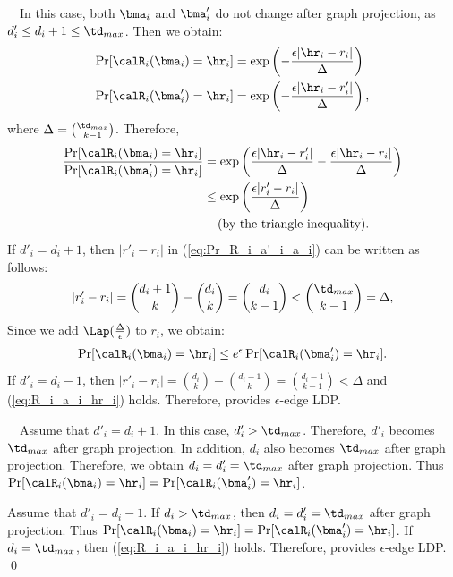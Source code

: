 \smallskip
{}~~In this case, both $\bma_i$ and $\bma'_i$ do not change after graph projection, as $d'_i \leq d_i + 1 \leq \td_{max}$. 
Then we obtain:
\begin{align*}
\Pr[\calR_i(\bma_i) = \hr_i] &= \exp\left(-\frac{\epsilon |\hr_i- r_i|}{\Delta}\right) \\
\Pr[\calR_i(\bma'_i) = \hr_i] &= \exp\left(-\frac{\epsilon |\hr_i- r'_i|}{\Delta}\right),
\end{align*}
where $\Delta = \binom{\td_{max}}{k-1}$. 
Therefore, 
\begin{align}
\frac{\Pr[\calR_i(\bma_i) = \hr_i]}{\Pr[\calR_i(\bma'_i) = \hr_i]} 
&= \exp\left( \frac{\epsilon |\hr_i- r'_i|}{\Delta} - \frac{\epsilon |\hr_i- r_i|}{\Delta}\right) \nonumber\\
&\leq  \exp\left( \frac{\epsilon |r'_i- r_i|}{\Delta} \right) \label{eq:Pr_R_i_a'_i_a_i}\\
& \hspace{4mm} (\text{by the triangle inequality}). \nonumber
\end{align}
If $d'_i = d_i + 1$, then $|r'_i- r_i|$ in (\ref{eq:Pr_R_i_a'_i_a_i}) can be written as follows:
\begin{align*}
|r'_i- r_i| 
= \binom{d_i+1}{k} - \binom{d_i}{k} 
= \binom{d_i}{k-1}
< \binom{\td_{max}}{k-1}
= \Delta, 
\end{align*}
Since we add $\Lap(\frac{\Delta}{\epsilon})$ to $r_i$, we obtain:
\begin{align}
\Pr[\calR_i(\bma_i) = \hr_i] \leq e^\epsilon \Pr[\calR_i(\bma'_i) = \hr_i]. 
\label{eq:R_i_a_i_hr_i}
\end{align}
If $d'_i = d_i - 1$, then $|r'_i- r_i| = \binom{d_i}{k} - \binom{d_i-1}{k} = \binom{d_i-1}{k-1} < \Delta$ and (\ref{eq:R_i_a_i_hr_i}) holds. 
Therefore,  provides $\epsilon$-edge LDP. 

\smallskip
{}~~Assume 
that $d'_i = d_i + 1$. 
In this case, $d'_i > \td_{max}$. 
Therefore, $d'_i$ becomes $\td_{max}$ after graph projection. 
In addition, 
$d_i$ also becomes $\td_{max}$ after graph projection. 
Therefore, we obtain 
$d_i = d'_i = \td_{max}$ after graph projection. 
Thus 
$\Pr[\calR_i(\bma_i) = \hr_i] = \Pr[\calR_i(\bma'_i) = \hr_i]$. 

Assume that $d'_i = d_i - 1$. 
If $d_i > \td_{max}$, then $d_i = d'_i = \td_{max}$ after graph projection. 
Thus $\Pr[\calR_i(\bma_i) = \hr_i] = \Pr[\calR_i(\bma'_i) = \hr_i]$. 
If $d_i = \td_{max}$, then (\ref{eq:R_i_a_i_hr_i}) holds. 
Therefore,  provides $\epsilon$-edge LDP. \qed

